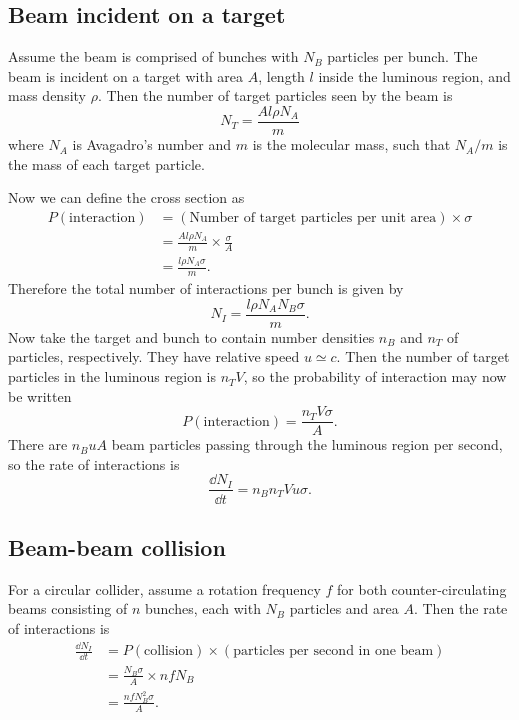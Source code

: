 \documentclass{report}
\begin{document}
\subsection{Beam incident on a target}
Assume the beam is comprised of bunches with $N_B$ particles per bunch. The beam is incident on a target with area $A$, length $l$ inside the luminous region, and mass density $\rho$. Then the number of target particles seen by the beam is
\begin{equation}
N_T = \frac{Al\rho N_A}{m}
\end{equation}
where $N_A$ is Avagadro's number and $m$ is the molecular mass, such that $N_A/m$ is the mass of each target particle.

Now we can define the cross section as
\begin{align}
P(\text{interaction}) &= (\text{Number of target particles per unit area}) \times \sigma \\
&= \frac{Al\rho N_A}{m} \times \frac{\sigma}{A} \nonumber \\
&= \frac{l\rho N_A \sigma}{m}.
\end{align}
Therefore the total number of interactions per bunch is given by
\begin{equation}
N_I = \frac{l\rho N_A N_B \sigma}{m}.
\end{equation}
Now take the target and bunch to contain number densities $n_B$ and $n_T$ of particles, respectively. They have relative speed $u \simeq c$. Then the number of target particles in the luminous region is $n_T V$, so the probability of interaction may now be written
\begin{equation}
P(\text{interaction}) = \frac{n_T V \sigma}{A}.
\end{equation}
There are $n_B u A$ beam particles passing through the luminous region per second, so the rate of interactions is
\begin{equation}
\frac{\dd N_I}{\dd t} = n_B n_T V u \sigma.
\end{equation}

\subsection{Beam-beam collision}
For a circular collider, assume a rotation frequency $f$ for both counter-circulating beams consisting of $n$ bunches, each with $N_B$ particles and area $A$. Then the rate of interactions is
\begin{align}
\frac{\dd N_I}{\dd t} &= P(\text{collision}) \times (\text{particles per second in one beam}) \\
&= \frac{N_B \sigma}{A} \times n f N_B \nonumber \\
&= \frac{n f N_B^2 \sigma}{A} \label{eq:collRate}.
\end{align}
\end{document}
